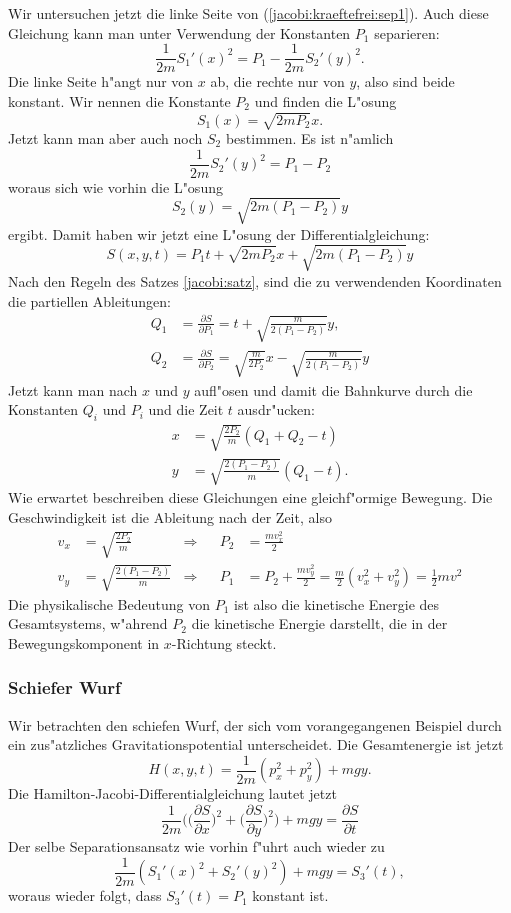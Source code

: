 Wir untersuchen jetzt die linke Seite von (\ref{jacobi:kraeftefrei:sep1}).
Auch diese Gleichung kann man unter Verwendung der Konstanten $P_1$
separieren:
\[
\frac1{2m} S_1'(x)^2
=
P_1-\frac1{2m}S_2'(y)^2.
\]
Die linke Seite h"angt nur von $x$ ab, die rechte nur von $y$, also
sind beide konstant. 
Wir nennen die Konstante $P_2$ und finden die L"osung
\[
S_1(x)
=
\sqrt{2mP_2}x.
\]
Jetzt kann man aber auch noch $S_2$ bestimmen. Es ist n"amlich 
\[
\frac1{2m} S_2'(y)^2
=P_1-P_2
\]
woraus sich wie vorhin die L"osung
\[
S_2(y)
=
\sqrt{2m(P_1-P_2)}y
\]
ergibt. Damit haben wir jetzt eine L"osung der Differentialgleichung:
\[
S(x,y,t)=
P_1t
+
\sqrt{2mP_2}x
+
\sqrt{2m(P_1-P_2)}y
\]
Nach den Regeln des Satzes \ref{jacobi:satz}, sind die zu verwendenden
Koordinaten die partiellen Ableitungen:
\begin{align*}
Q_1&=\frac{\partial S}{\partial P_1}
=
t + \sqrt{\frac{m}{2(P_1-P_2)}}y,\\
Q_2&=\frac{\partial S}{\partial P_2}
=
\sqrt{\frac{m}{2P_2}}x
-
\sqrt{\frac{m}{2(P_1-P_2)}}y
\end{align*}
Jetzt kann man nach $x$ und $y$ aufl"osen und damit die
Bahnkurve durch die Konstanten $Q_i$ und $P_i$ und die Zeit $t$
ausdr"ucken:
\begin{align*}
x&=\sqrt{\frac{2P_2}{m}}(Q_1+Q_2-t)\\
y&=\sqrt{\frac{2(P_1-P_2)}{m}}(Q_1-t).
\end{align*}
Wie erwartet beschreiben diese Gleichungen eine gleichf"ormige
Bewegung. Die Geschwindigkeit ist die Ableitung nach der Zeit,
also
\begin{align*}
v_x
&=
\sqrt{\frac{2P_2}{m}}
&\Rightarrow&&
P_2&=\frac{mv_x^2}2
\\
v_y
&=
\sqrt{\frac{2(P_1-P_2)}{m}}
&\Rightarrow&&
P_1&=P_2+\frac{mv_y^2}2=\frac{m}2(v_x^2+v_y^2)=\frac12mv^2
\end{align*}
Die physikalische Bedeutung von $P_1$ ist also die kinetische
Energie des
Gesamtsystems, w"ahrend $P_2$ die kinetische Energie darstellt, die in
der Bewegungskomponent in $x$-Richtung steckt.

\subsubsection{Schiefer Wurf}
Wir betrachten den schiefen Wurf, der sich vom vorangegangenen
Beispiel durch ein zus"atzliches Gravitationspotential
unterscheidet. Die Gesamtenergie ist jetzt
\[
H(x,y,t)=\frac1{2m}(p_x^2+p_y^2)+mgy.
\]
Die Hamilton-Jacobi-Differentialgleichung lautet jetzt
\[
\frac1{2m}\biggl(
\biggl(\frac{\partial S}{\partial x}\biggr)^2
+
\biggl(\frac{\partial S}{\partial y}\biggr)^2
\biggr)
+mgy=\frac{\partial S}{\partial t} 
\]
Der selbe Separationsansatz wie vorhin f"uhrt auch wieder zu
\[
\frac1{2m}(S_1'(x)^2+S_2'(y)^2)+mgy=S_3'(t),
\]
woraus wieder folgt, dass $S_3'(t)=P_1$ konstant ist.


